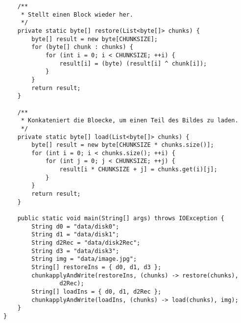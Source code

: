 \documentclass[ngerman]{fbi-aufgabenblatt}
\begin{document}
\begin{lstlisting}
	/**
	 * Stellt einen Block wieder her.
	 */
	private static byte[] restore(List<byte[]> chunks) {
		byte[] result = new byte[CHUNKSIZE];
		for (byte[] chunk : chunks) {
			for (int i = 0; i < CHUNKSIZE; ++i) {
				result[i] = (byte) (result[i] ^ chunk[i]);
			}
		}
		return result;
	}

	/**
	 * Konkateniert die Bloecke, um einen Teil des Bildes zu laden.
	 */
	private static byte[] load(List<byte[]> chunks) {
		byte[] result = new byte[CHUNKSIZE * chunks.size()];
		for (int i = 0; i < chunks.size(); ++i) {
			for (int j = 0; j < CHUNKSIZE; ++j) {
				result[i * CHUNKSIZE + j] = chunks.get(i)[j];
			}
		}
		return result;
	}

	public static void main(String[] args) throws IOException {
		String d0 = "data/disk0";
		String d1 = "data/disk1";
		String d2Rec = "data/disk2Rec";
		String d3 = "data/disk3";
		String img = "data/image.jpg";
		String[] restoreIns = { d0, d1, d3 };
		chunkapplyAndWrite(restoreIns, (chunks) -> restore(chunks),
				d2Rec);
		String[] loadIns = { d0, d1, d2Rec };
		chunkapplyAndWrite(loadIns, (chunks) -> load(chunks), img);
	}
}

\end{lstlisting}
\end{document}
